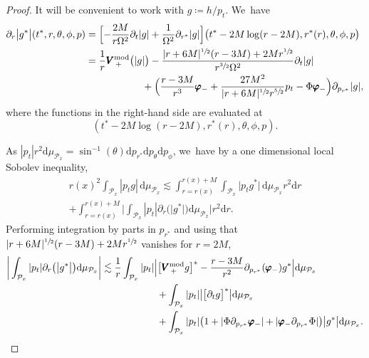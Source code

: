 \documentclass[10pt]{amsart}
\theoremstyle{plain}
\theoremstyle{definition}
\newcommand\dr{{\mathrm{d}}}
\begin{document}
\begin{proof}
It will be convenient to work with $g\coloneqq h/p_t$. We~have
\begin{align*}
\partial_r\big|g^*\big|(t^*,r,\theta,\phi,p) & = \Bigl[ -\frac{2M}{r \Omega^2} \partial_t | g|+\frac{1}{\Omega^2} \partial_{r^*} |g | \Bigr] \bigl(t^*-2M\log(r-2M),r^*(r),\theta,\phi,p \bigr) \\
& = \frac{1}{r} \pmb{V}_{\, +}^{ \mathrm{mod}}\bigl(|g| \bigr)-\frac{|r+6M|^{\sfrac{1}{2}}(r-3M)+2Mr^{\sfrac{1}{2}}}{r^{\sfrac{3}{2}}\Omega^2} \partial_t |g| \\
& \hspace*{2cm} +\Bigl(\frac{r-3M}{r^3} \pmb{\varphi}_- +\frac{27M^2 }{|r+6M|^{\sfrac{1}{2}}r^{\sfrac{5}{2}}}p_t - \Phi \pmb{\varphi}_-\Bigr) \partial_{p_{r^*}}|g|,
\end{align*}
where the functions in the right-hand side are evaluated at
\[
(t^*-2M\log(r-2M),r^*(r),\theta,\phi,p).
\]

As $|p_t|r^2 \dr \mu_{\mathcal{P}_x}= \sin^{-1} (\theta)\dr p_{r^*} \dr p_\theta \dr p_\phi$, we~have by a one dimensional local Sobolev inequality,
\begin{multline*}
r(x)^2 \! \int_{\mathcal{P}_x} |p_t g| \, \dr \mu_{\mathcal{P}_x} \lesssim \int_{r=r(x)}^{r(x)+M} \int_{\mathcal{P}_x} \big|p_t g^*\big| \, \dr \mu_{\mathcal{P}_x} r^2 \dr r \\
+\int_{r=r(x)}^{r(x)+M} \bigg| \int_{\mathcal{P}_x}|p_t|\partial_r\bigl(\big| g^*\big|\bigr) \dr \mu_{\mathcal{P}_x} \bigg| r^2 \dr r.
\end{multline*}
Performing integration by parts in $p_{r^*}$ and using that $|r+6M|^{\sfrac{1}{2}}(r-3M)+2Mr^{\sfrac{1}{2}}$ vanishes for $r=2M$,
\begin{align*}
\bigg| \int_{\mathcal{P}_x}|p_t|\partial_r\bigl(\big| g^* \big|\bigr) \dr \mu_{\mathcal{P}_x} \bigg| & \lesssim \frac{1}{r} \int_{\mathcal{P}_x}|p_t| \Bigl | \bigl[ \pmb{V}_{\, +}^{ \mathrm{mod}} g \bigr]^* -\frac{r-3M}{r^2} \partial_{p_{r^*}}(\pmb{\varphi}_-) g^* \Bigr| \dr \mu_{\mathcal{P}_x} \\
& \hspace*{2cm}+ \int_{\mathcal{P}_x}|p_t| \big| \bigl[ \partial_t g \bigr]^* \big| \dr \mu_{\mathcal{P}_x} \\
& \hspace*{2cm}+ \int_{\mathcal{P}_x} |p_t|\bigl(1+ |\Phi \partial_{p_{r^*}} \pmb{\varphi}_-|+|\pmb{\varphi}_- \partial_{p_{r^*}} \Phi |\bigr) \big| g^* \big| \dr \mu_{\mathcal{P}_x}.
\end{align*}


\end{proof}
\end{document}
